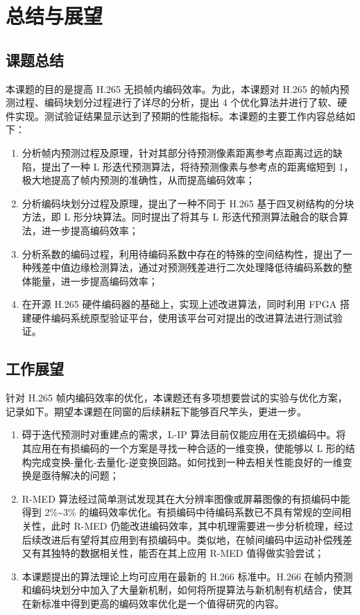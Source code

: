\chapter{总结与展望}
\label{cha:c6}

\section{课题总结}
本课题的目的是提高 H.265 无损帧内编码效率。为此，本课题对 H.265 的帧内预测过程、编码块划分过程进行了详尽的分析，提出 4 个优化算法并进行了软、硬件实现。测试验证结果显示达到了预期的性能指标。本课题的主要工作内容总结如下：
\begin{enumerate}
    \item 分析帧内预测过程及原理，针对其部分待预测像素距离参考点距离过远的缺陷，提出了一种 L 形迭代预测算法，将待预测像素与参考点的距离缩短到 1，极大地提高了帧内预测的准确性，从而提高编码效率；
    \item 分析编码块划分过程及原理，提出了一种不同于 H.265 基于四叉树结构的分块方法，即 L 形分块算法。同时提出了将其与 L 形迭代预测算法融合的联合算法，进一步提高编码效率；
    \item 分析系数的编码过程，利用待编码系数中存在的特殊的空间结构性，提出了一种残差中值边缘检测算法，通过对预测残差进行二次处理降低待编码系数的整体能量，进一步提高编码效率；
    \item 在开源 H.265 硬件编码器的基础上，实现上述改进算法，同时利用 FPGA 搭建硬件编码系统原型验证平台，使用该平台可对提出的改进算法进行测试验证。
\end{enumerate}

\section{工作展望}
针对 H.265 帧内编码效率的优化，本课题还有多项想要尝试的实验与优化方案，记录如下。期望本课题在同窗的后续耕耘下能够百尺竿头，更进一步。
\begin{enumerate}
    \item 碍于迭代预测时对重建点的需求，L-IP 算法目前仅能应用在无损编码中。将其应用在有损编码的一个方案是寻找一种合适的一维变换，使能够以 L 形的结构完成变换-量化-去量化-逆变换回路。如何找到一种去相关性能良好的一维变换是亟待解决的问题；
    \item R-MED 算法经过简单测试发现其在大分辨率图像或屏幕图像的有损编码中能得到 2\%\textasciitilde 3\% 的编码效率优化。有损编码中待编码系数已不具有常规的空间相关性，此时 R-MED 仍能改进编码效率，其中机理需要进一步分析梳理，经过后续改进后有望将其应用到有损编码中。类似地，在帧间编码中运动补偿残差又有其独特的数据相关性，能否在其上应用 R-MED 值得做实验尝试；
    \item 本课题提出的算法理论上均可应用在最新的 H.266 标准中。H.266 在帧内预测和编码块划分中加入了大量新机制，如何将所提算法与新机制有机结合，使其在新标准中得到更高的编码效率优化是一个值得研究的内容。
\end{enumerate}